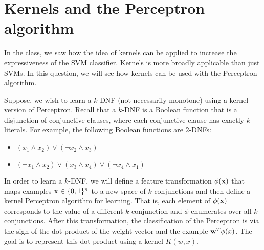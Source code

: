 \section{Kernels and the Perceptron algorithm}
\label{sec:kernel}

In the class, we saw how the idea of kernels can be applied to
increase the expressiveness of the SVM classifier. Kernels is more
broadly applicable than just SVMs. In this question, we will see how
kernels can be used with the Perceptron algorithm.

Suppose, we wish to learn a $k$-DNF (not necessarily monotone) using a
kernel version of Perceptron. Recall that a $k$-DNF is a Boolean
function that is a disjunction of conjunctive clauses, where each
conjunctive clause has exactly $k$ literals. For example, the
following Boolean functions are $2$-DNFs:
\begin{itemize}
\item $(x_1 \wedge x_2) \vee (\neg x_2 \wedge x_3)$
\item $(\neg x_1 \wedge x_2) \vee (x_3 \wedge x_4) \vee (\neg x_4 \wedge x_1)$
\end{itemize}

In order to learn a $k$-DNF, we will define a feature transformation
$\phi({\bf x})$ that maps examples ${\bf x} \in \{0,1\}^n$ to a new space of
$k$-conjunctions and then define a kernel Perceptron algorithm for
learning. That is, each element of $\phi({\bf x})$ corresponds to the
value of a different $k$-conjunction and $\phi$ enumerates over all
$k$-conjunctions. After this transformation, the classification of the
Perceptron is via the sign of the dot product of the weight vector and
the example ${\bf w}^T\phi(x)$. The goal is to represent this dot product
using a kernel $K(w, x)$.



